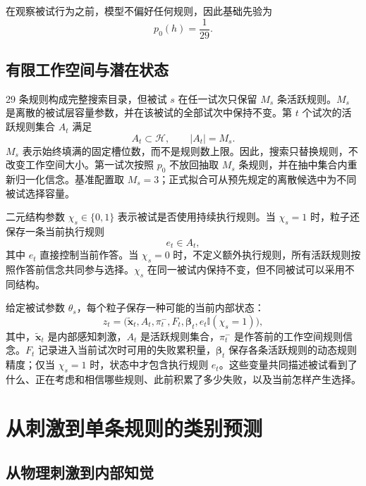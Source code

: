 \documentclass[12pt]{article}
\newcommand{\ind}{\mathbb I}
\begin{document}
在观察被试行为之前，模型不偏好任何规则，因此基础先验为
\begin{equation}
p_0(h)=\frac{1}{29}.
\label{eq:base-prior}
\end{equation}

\subsection{有限工作空间与潜在状态}

29 条规则构成完整搜索目录，但被试 $s$ 在任一试次只保留 $M_s$ 条活跃规则。$M_s$ 是离散的被试层容量参数，并在该被试的全部试次中保持不变。第 $t$ 个试次的活跃规则集合 $A_t$ 满足
\begin{equation}
A_t\subset\mathcal H,
\qquad
|A_t|=M_s.
\label{eq:active-set}
\end{equation}
$M_s$ 表示始终填满的固定槽位数，而不是规则数上限。因此，搜索只替换规则，不改变工作空间大小。第一试次按照 $p_0$ 不放回抽取 $M_s$ 条规则，并在抽中集合内重新归一化信念。基准配置取 $M_s=3$；正式拟合可从预先规定的离散候选中为不同被试选择容量。

二元结构参数 $\chi_s\in\{0,1\}$ 表示被试是否使用持续执行规则。当 $\chi_s=1$ 时，粒子还保存一条当前执行规则
\begin{equation}
e_t\in A_t,
\label{eq:executed-rule}
\end{equation}
其中 $e_t$ 直接控制当前作答。当 $\chi_s=0$ 时，不定义额外执行规则，所有活跃规则按照作答前信念共同参与选择。$\chi_s$ 在同一被试内保持不变，但不同被试可以采用不同结构。

给定被试参数 $\theta_s$，每个粒子保存一种可能的当前内部状态：
\begin{equation}
z_t=
\bigl(
\widetilde{\bm x}_t,
A_t,
\pi_t^{-},
F_t,
\bm\beta_t,
e_t\ind(\chi_s=1)
\bigr),
\label{eq:latent-state}
\end{equation}
其中，$\widetilde{\bm x}_t$ 是内部感知刺激，$A_t$ 是活跃规则集合，$\pi_t^{-}$ 是作答前的工作空间规则信念。$F_t$ 记录进入当前试次时可用的失败累积量，$\bm\beta_t$ 保存各条活跃规则的动态规则精度；仅当 $\chi_s=1$ 时，状态中才包含执行规则 $e_t$。这些变量共同描述被试看到了什么、正在考虑和相信哪些规则、此前积累了多少失败，以及当前怎样产生选择。


\section{从刺激到单条规则的类别预测}

\subsection{从物理刺激到内部知觉}
\end{document}
